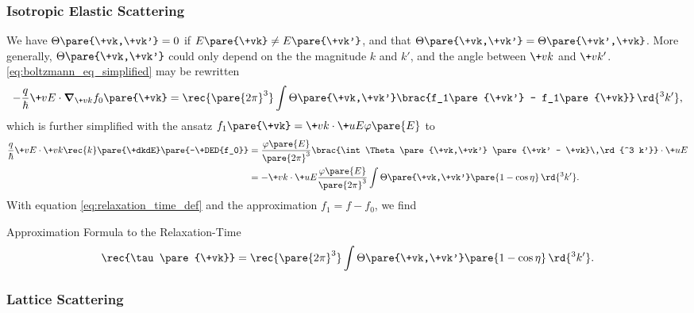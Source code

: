 \documentclass[hidelinks]{article}
\begin{document}

\subsubsection{Isotropic Elastic Scattering} %
\label{ssub:isotropic_elastic_scattering}

We have $\Theta\pare{\+vk,\+vk'} = 0$ if $E\pare{\+vk} \neq E\pare{\+vk'}$, and that $\Theta\pare{\+vk,\+vk'} = \Theta\pare{\+vk',\+vk}$. More generally, $\Theta\pare{\+vk,\+vk'}$ could only depend on the the magnitude $k$ and $k'$, and the angle between $\+vk$ and $\+vk'$. \eqref{eq:boltzmann_eq_simplified} may be rewritten
\[ -\frac{q}{\hbar}\+vE\cdot \grad_{\+vk}f_0\pare{\+vk} = \rec{\pare{2\pi}^3} \int \Theta\pare{\+vk,\+vk'}\brac{f_1\pare{\+vk'} - f_1\pare{\+vk}}\,\rd{^3 k'}, \]
which is further simplified with the ansatz $f_1\pare{\+vk} = \+vk\cdot \+uE \varphi\pare{E}$ to
\begin{align*}
    \frac{q}{\hbar}\+vE\cdot \+vk \rec{k}\pare{\+dkdE}\pare{-\+DED{f_0}} &= \frac{\varphi\pare{E}}{\pare{2\pi}^3}\brac{\int \Theta\pare{\+vk,\+vk'} \pare{\+vk' - \+vk}\,\rd{^3 k'}}\cdot \+uE \\
    &= -\+vk\cdot \+uE \frac{\varphi\pare{E}}{\pare{2\pi}^3} \int \Theta\pare{\+vk,\+vk'}\pare{1-\cos\eta}\,\rd{^3 k'}.
\end{align*}
With equation \eqref{eq:relaxation_time_def} and the approximation $f_1 = f - f_0$, we find
\begin{finaleq}{Approximation Formula to the Relaxation-Time}
    \begin{equation}
        \label{eq:approximation_relaxation_time}
        \rec{\tau\pare{\+vk}} = \rec{\pare{2\pi}^3}\int \Theta\pare{\+vk,\+vk'}\pare{1-\cos\eta}\,\rd{^3 k'}.
    \end{equation}
\end{finaleq}


\subsubsection{Lattice Scattering} %
\label{ssub:lattice_scattering}
\end{document}
